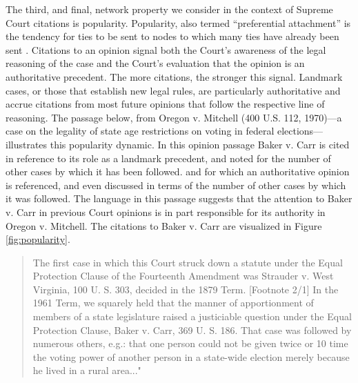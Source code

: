 \documentclass[headsepline=true, abstracton]{scrartcl}
\begin{document}
The third, and final, network property we consider in the context of Supreme Court citations is popularity. Popularity, also termed ``preferential attachment'' is the tendency for ties to be sent to nodes to which many ties have already been sent \citep{barabasi1999emergence,chayes2013mathematics}. Citations to an opinion signal both the Court's awareness of the legal reasoning of the case and the Court's evaluation that the opinion is an authoritative precedent. The more citations, the stronger this signal. Landmark cases, or those that establish new legal rules, are particularly authoritative and accrue citations from most future opinions that follow the respective line of reasoning. The passage below, from Oregon v. Mitchell (400 U.S. 112, 1970)---a case on the legality of state age restrictions on voting in federal elections---illustrates this popularity dynamic. In this opinion passage Baker v. Carr is cited in reference to its role as a landmark precedent, and noted for the number of other cases by which it has been followed. and for which an authoritative opinion is referenced, and even discussed in terms of the number of other cases by which it was followed. The language in this passage suggests that the attention to Baker v. Carr in previous Court opinions is in part responsible for its authority in Oregon v. Mitchell. The citations to Baker v. Carr are visualized in Figure \ref{fig:popularity}.
\begin{quotation}
	The first case in which this Court struck down a statute under the Equal Protection Clause of the Fourteenth Amendment was Strauder v. West Virginia, 100 U. S. 303, decided in the 1879 Term. [Footnote 2/1] In the 1961 Term, we squarely held that the manner of apportionment of members of a state legislature raised a justiciable question under the Equal Protection Clause, Baker v. Carr, 369 U. S. 186. That case was followed by numerous others, e.g.: that one person could not be given twice or 10 time the voting power of another person in a state-wide election merely because he lived in a rural area..."
\end{quotation} %
\end{document}
